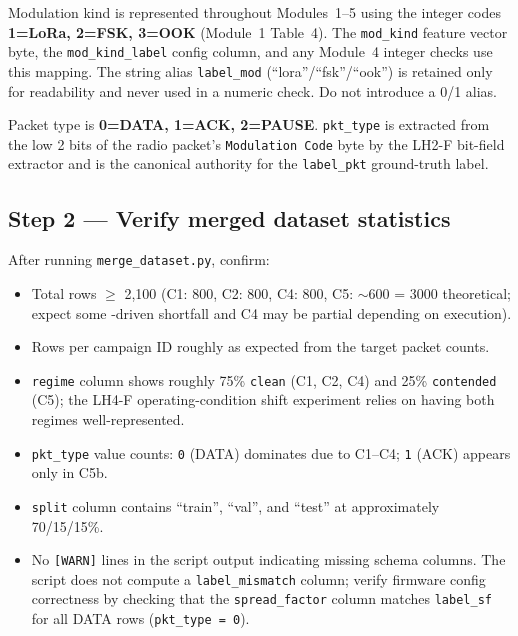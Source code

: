 \documentclass[11pt,letterpaper]{article}
\begin{document}
\begin{tcolorbox}[infobox={Canonical Modulation Kind and Packet Type Mappings}]
Modulation kind is represented throughout Modules~1--5 using the integer codes \textbf{1=LoRa, 2=FSK, 3=OOK} (Module~1 Table~4). The \texttt{mod\_kind} feature vector byte, the \texttt{mod\_kind\_label} config column, and any Module~4 integer checks use this mapping. The string alias \texttt{label\_mod} (``lora''/``fsk''/``ook'') is retained only for readability and never used in a numeric check. Do not introduce a 0/1 alias.

Packet type is \textbf{0=DATA, 1=ACK, 2=PAUSE}. \texttt{pkt\_type} is extracted from the low 2 bits of the radio packet's \texttt{Modulation Code} byte by the LH2-F bit-field extractor and is the canonical authority for the \texttt{label\_pkt} ground-truth label.
\end{tcolorbox}

\newpage
\subsection{Step 2 --- Verify merged dataset statistics}
After running \texttt{merge\_dataset.py}, confirm:
\begin{itemize}[leftmargin=2em]
	\item Total rows $\geq$ 2{,}100 (C1: 800, C2: 800, C4: 800, C5: $\sim$600 = 3000 theoretical; expect some \PER{}-driven shortfall and C4 may be partial depending on execution).
	\item Rows per campaign ID roughly as expected from the target packet counts.
	\item \texttt{regime} column shows roughly 75\% \texttt{clean} (C1, C2, C4) and 25\% \texttt{contended} (C5); the LH4-F operating-condition shift experiment relies on having both regimes well-represented.
	\item \texttt{pkt\_type} value counts: \texttt{0} (DATA) dominates due to C1--C4; \texttt{1} (ACK) appears only in C5b.
	\item \texttt{split} column contains ``train'', ``val'', and ``test'' at approximately 70/15/15\%.
	\item No \texttt{[WARN]} lines in the script output indicating missing schema columns. The script does not compute a \texttt{label\_mismatch} column; verify firmware config correctness by checking that the \texttt{spread\_factor} column matches \texttt{label\_sf} for all DATA rows (\texttt{pkt\_type = 0}).
\end{itemize}
\end{document}
